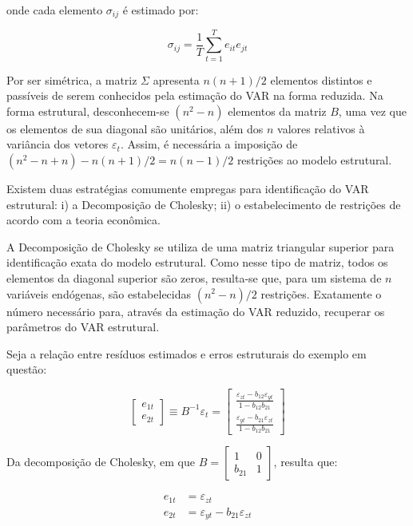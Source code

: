 onde cada elemento  \(\sigma_{ij}\) é estimado por:

\begin{equation}
\sigma_{ij} = \frac{1}{T} \sum_{t=1}^{T} e_{it}e_{jt}
\end{equation}

Por ser simétrica, a matriz \(\Sigma\) apresenta \( n(n+1)/2\) elementos distintos e passíveis de serem conhecidos pela estimação do VAR na forma reduzida. Na forma estrutural, desconhecem-se \((n^2-n)\) elementos da matriz \(B\), uma vez que os elementos de sua diagonal são unitários, além dos \(n\) valores relativos à variância dos vetores \(\varepsilon_t\). Assim, é necessária a imposição de \((n^2-n + n) - n(n+1)/2 = n(n-1)/2\) restrições ao modelo estrutural. 

Existem duas estratégias comumente empregas para identificação do VAR estrutural: i) a Decomposição de Cholesky; ii) o estabelecimento de restrições de acordo com a teoria econômica.

A Decomposição de Cholesky se utiliza de uma matriz triangular superior para identificação exata do modelo estrutural. Como nesse tipo de matriz, todos os elementos da diagonal superior são zeros, resulta-se que, para um sistema de \(n\) variáveis endógenas, são estabelecidas \((n^2-n)/2\) restrições. Exatamente o número necessário para, através da estimação do VAR reduzido, recuperar os parâmetros do VAR estrutural. 

Seja a relação entre resíduos estimados e erros estruturais do exemplo em questão:

\begin{equation}\begin{bmatrix}e_{1t} \\e_{2t}
\end{bmatrix}\equiv B^{-1}\varepsilon_t =\begin{bmatrix}
\frac{\varepsilon_{zt} - b_{12} \varepsilon_{yt}}{1 - b_{12}b_{21}} \\[5pt]\frac{\varepsilon_{yt} - b_{21} \varepsilon_{zt}}{1 - b_{12}b_{21}}\end{bmatrix}
\end{equation}

Da decomposição de Cholesky, em que \(B = \begin{bmatrix} 1 & 0 \\ b_{21} & 1 \end{bmatrix}\), resulta que: 


\begin{equation}\begin{aligned}
    e_{1t} &= \varepsilon_{zt} \\
    e_{2t} &= \varepsilon_{yt} - b_{21}\varepsilon_{zt}
\end{aligned}\end{equation}

